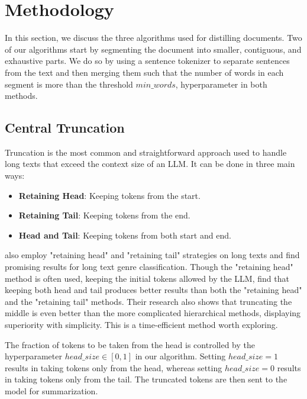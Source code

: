 \section{Methodology}
	\label{sec:methodology}

	In this section, we discuss the three algorithms used for distilling documents.
	Two of our algorithms start by segmenting the document into smaller, contiguous, and exhaustive
	parts.
	We do so by using a sentence tokenizer to separate sentences from the text and then merging
	them such that the number of words in each segment is more than the threshold $min\_words$,
	hyperparameter in both methods.


	\subsection{Central Truncation}
		\label{method:truncation}

		Truncation is the most common and straightforward approach used to handle long texts that exceed
		the context size of an LLM.
		It can be done in three main ways:

		\begin{itemize}
			\item \textbf{Retaining Head}: Keeping tokens from the start.
			\item \textbf{Retaining Tail}: Keeping tokens from the end.
			\item \textbf{Head and Tail}: Keeping tokens from both start and end.
		\end{itemize}

		\citet{worsham-kalita-2018-genre} also employ "retaining head" and "retaining tail" strategies
		on long texts and find promising results for long text genre classification.
		Though the "retaining head" method is often used, keeping the initial tokens allowed by the LLM,
		\citet{sun2019fine} find that keeping both head and tail produces better results than both the
		"retaining head" and the "retaining tail" methods.
		Their research also shows that truncating the middle is even better than the more complicated
		hierarchical methods, displaying superiority with simplicity.
		This is a time-efficient method worth exploring.

		The fraction of tokens to be taken from the head is controlled by the hyperparameter $head\_size
		\in [0, 1]$ in our algorithm.
		Setting $head\_size = 1$ results in taking tokens only from the head, whereas setting $head\_size
		= 0$ results in taking tokens only from the tail.
		The truncated tokens are then sent to the model for summarization.


